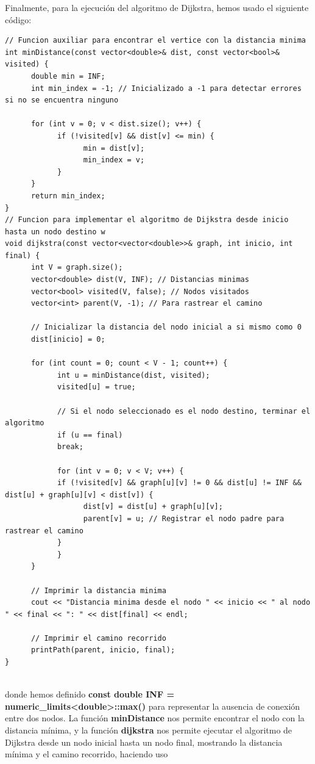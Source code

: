 \documentclass[11pt,openany]{book}
\begin{document}
Finalmente, para la ejecución del algoritmo de Dijkstra, hemos usado el siguiente código:
\begin{lstlisting}
// Funcion auxiliar para encontrar el vertice con la distancia minima
int minDistance(const vector<double>& dist, const vector<bool>& visited) {
      double min = INF;
      int min_index = -1; // Inicializado a -1 para detectar errores si no se encuentra ninguno

      for (int v = 0; v < dist.size(); v++) {
            if (!visited[v] && dist[v] <= min) {
                  min = dist[v];
                  min_index = v;
            }
      }
      return min_index;
}
// Funcion para implementar el algoritmo de Dijkstra desde inicio hasta un nodo destino w
void dijkstra(const vector<vector<double>>& graph, int inicio, int final) {
      int V = graph.size();
      vector<double> dist(V, INF); // Distancias minimas
      vector<bool> visited(V, false); // Nodos visitados
      vector<int> parent(V, -1); // Para rastrear el camino

      // Inicializar la distancia del nodo inicial a si mismo como 0
      dist[inicio] = 0;
      
      for (int count = 0; count < V - 1; count++) {
            int u = minDistance(dist, visited);
            visited[u] = true;
      
            // Si el nodo seleccionado es el nodo destino, terminar el algoritmo
            if (u == final)
            break;
      
            for (int v = 0; v < V; v++) {
            if (!visited[v] && graph[u][v] != 0 && dist[u] != INF && dist[u] + graph[u][v] < dist[v]) {
                  dist[v] = dist[u] + graph[u][v];
                  parent[v] = u; // Registrar el nodo padre para rastrear el camino
            }
            }
      }
      
      // Imprimir la distancia minima
      cout << "Distancia minima desde el nodo " << inicio << " al nodo " << final << ": " << dist[final] << endl;

      // Imprimir el camino recorrido
      printPath(parent, inicio, final);
}
       
\end{lstlisting}
donde hemos definido \textbf{const double INF = numeric\_limits<double>::max()} para representar la ausencia de conexión entre dos nodos.
La función \textbf{minDistance} nos permite encontrar el nodo con la distancia mínima, y la función \textbf{dijkstra} nos permite ejecutar
el algoritmo de Dijkstra desde un nodo inicial hasta un nodo final, mostrando la distancia mínima y el camino recorrido, haciendo uso
\end{document}
